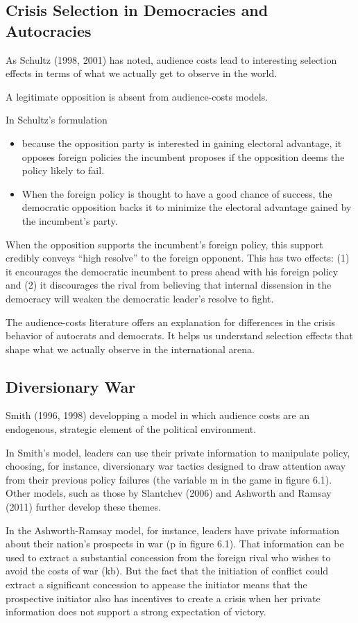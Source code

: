\subsection{Crisis Selection in Democracies and Autocracies}
As Schultz (1998, 2001) has noted, audience costs lead to interesting selection effects in terms of what we actually get to observe in the world.

A legitimate opposition is absent from audience-costs models.

In Schultz’s formulation
\begin{itemize}
    \item because the opposition party is interested in gaining electoral advantage, it opposes foreign policies the incumbent proposes if the opposition deems the policy likely to fail.
    \item When the foreign policy is thought to have a good chance of success, the democratic opposition backs it to minimize the electoral advantage gained by the incumbent’s party.
\end{itemize}

When the opposition supports the incumbent’s foreign policy, this support credibly conveys “high resolve” to the foreign opponent. This has two effects: (1) it encourages the democratic incumbent to press ahead with his foreign policy and (2) it discourages the rival from believing that internal dissension in the democracy will weaken the democratic leader’s resolve to fight.

The audience-costs literature offers an explanation for differences in the crisis behavior of autocrats and democrats. It helps us understand selection effects that shape what we actually observe in the international arena.

\subsection{Diversionary War}
Smith (1996, 1998) developping a model in which audience costs are an endogenous, strategic element of the political environment.

In Smith’s model, leaders can use their private information to manipulate policy, choosing, for instance, diversionary war tactics designed to draw attention away from their previous policy failures (the variable m in the game in figure 6.1). Other models, such as those by Slantchev (2006) and Ashworth and Ramsay (2011) further develop these themes.

In the Ashworth-Ramsay model, for instance, leaders have private information about their nation’s prospects in war (p in figure 6.1). That information can be used to extract a substantial concession from the foreign rival who wishes to avoid the costs of war (kb). But the fact that the initiation of conflict could extract a significant concession to appease the initiator means that the prospective initiator also has incentives to create a crisis when her private information does not support a strong expectation of victory.

